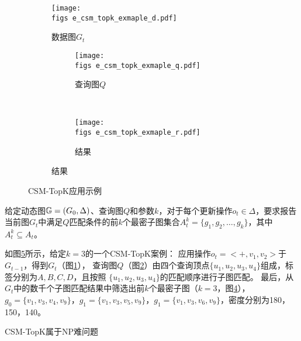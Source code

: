     \begin{figure}
        \def\wscorevone{0.49\linewidth}
        \centering
        \begin{subfigure}[h!]{0.59\linewidth}
            \centering
            \texttt{[image: \\figs e\_csm\_topk\_exmaple\_d.pdf]} %
            \caption{数据图$G_t$}
            \label{fig:example_data_graph}
        \end{subfigure}
        \hspace{-0.1cm} %
      \begin{subfigure}[t]{0.39\linewidth}
        \centering
        \begin{subfigure}[t]{\linewidth} %
          \centering
          \texttt{[image: \\figs e\_csm\_topk\_exmaple\_q.pdf]} %
          \caption{查询图$Q$}
          \label{fig:example_query_graph}
        \end{subfigure}
        \\[2.5em] %
        \begin{subfigure}[t]{\linewidth} %
            \centering
            \texttt{[image: \\figs e\_csm\_topk\_exmaple\_r.pdf]} %
            \caption{结果}
            \label{fig:example_result}
          \end{subfigure}
      \end{subfigure}
      \caption{CSM-TopK应用示例}
      \label{fig:csm-topk}
    \end{figure}
    \begin{definition}\label{def:problem-definition}
    给定动态图$\mathbb{G}=(G_0, \Delta)$、查询图$Q$和参数$k$，对于每个更新操作$o_t\in \Delta$，要求报告当前图$G_t$中满足$Q$匹配条件的前$k$个最密子图集合$A_{t}^k= \{g_1, g_2, \ldots, g_k\}$，其中$A_t^k\subseteq A_t$。
    \end{definition}
    如图\ref{fig:csm-topk}所示，给定$k=3$的一个CSM-TopK案例：
    应用操作$o_t=<+,v_1, v_2>$于$G_{t-1}$，得到$G_t$（图\ref{fig:example_data_graph}），
    查询图$Q$（图\ref{fig:example_query_graph}）由四个查询顶点$\{u_1, u_2, u_3, u_4\}$组成，标签分别为$A,B,C,D$，且按照
    $\{u_1, u_2, u_3, u_4\}$的匹配顺序进行子图匹配。
    最后，从$G_t$中的数千个子图匹配结果中筛选出前$k$个最密子图（$k=3$，图\ref{fig:example_result}），
    $g_0=\{v_1, v_3, v_4, v_9\}$，$g_1=\{v_1, v_3, v_5, v_9\}$，$g_1=\{v_1, v_3, v_6, v_9\}$，密度分别为180，150，140。
    \begin{theorem} \label{theorem:np-hard}
    CSM-TopK属于NP难问题
    \end{theorem} %
        
